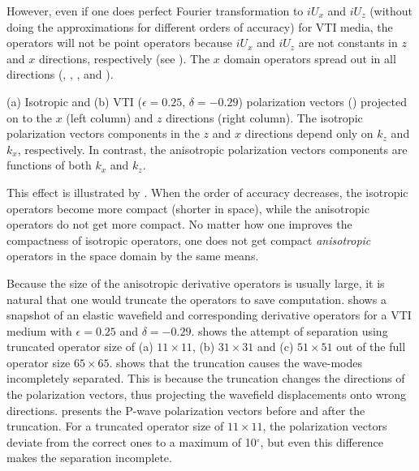 However, even if one does perfect Fourier transformation to $iU_x$ and
$iU_z$ (without doing the approximations for different orders of
accuracy) for VTI media, the operators will not be point operators
because $iU_x$ and $iU_z$ are not constants in $z$ and $x$ directions,
respectively (see ). The $x$ domain operators spread out in
all directions (, , ,
and ).

  {(a)
  Isotropic and (b) VTI ($\epsilon=0.25$, $\delta=-0.29$) polarization
  vectors () projected on to the $x$ (left
  column) and $z$ directions (right column). {The isotropic
  polarization vectors components in the $z$ and $x$ directions depend
  only on $k_z$ and $k_x$, respectively. In contrast, the anisotropic
  polarization vectors components are functions of both $k_x$ and
  $k_z$.}}

This effect is illustrated by
. When the order of
accuracy decreases, the isotropic operators become more compact
(shorter in space), while the anisotropic operators do not get more
compact. No matter how one improves the compactness of isotropic
operators, one does not get compact {\it anisotropic} operators in the
space domain by the same means.



Because the size of the anisotropic derivative operators is usually
large, it is natural that one would truncate the operators to save
computation.   shows a snapshot of an elastic wavefield
and corresponding derivative operators for a VTI medium with
$\epsilon=0.25$ and $\delta=-0.29$.   shows the
attempt of separation using truncated operator size of (a)
$11\times11$, (b) $31\times31$ and (c) $51\times51$ out of the full
operator size $65\times65$.  shows that the truncation
causes the wave-modes incompletely separated. This is because the
truncation changes the directions of the polarization vectors, thus
projecting the wavefield displacements onto wrong directions.
 presents
the P-wave polarization vectors before and after the truncation.  For
a truncated operator size of $11\times11$, the polarization vectors
deviate from the correct ones to a maximum of 10$^\circ$, but
even this difference makes the separation incomplete.




